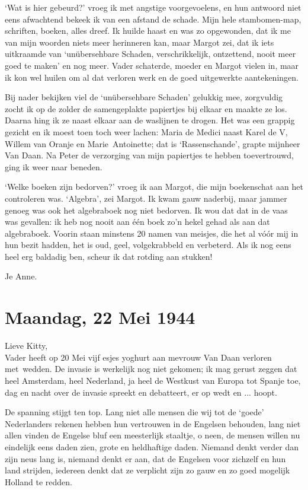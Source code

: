 \documentclass{book}
\begin{document}
`Wat is hier gebeurd?' vroeg ik met angstige voorgevoelens, en hun antwoord niet
eens afwachtend bekeek ik van een afstand de schade. Mijn hele stambomen-map,
schriften, boeken, alles dreef. Ik huilde haast en was zo opgewonden, dat ik me
van mijn woorden niets meer herinneren kan, maar Margot zei, dat ik iets
uitkraamde van `unübersehbare Schaden, verschrikkelijk, ontzettend, nooit meer
goed te maken' en nog meer.  Vader schaterde, moeder en Margot vielen in, maar
ik kon wel huilen om al dat verloren werk en de goed uitgewerkte aantekeningen.

Bij nader bekijken viel de `unübersehbare Schaden' gelukkig mee, zorgvuldig
zocht ik op de zolder de samengeplakte papiertjes bij elkaar en maakte ze los.
Daarna hing ik ze naast elkaar aan de waslijnen te drogen. Het was een grappig
gezicht en ik moest toen toch weer lachen: Maria de Medici naast Karel de V,
Willem van Oranje en Marie~Antoinette; dat is `Rassenschande', grapte mijnheer
Van Daan. Na Peter de verzorging van mijn papiertjes te hebben toevertrouwd,
ging ik weer naar beneden.

`Welke boeken zijn bedorven?' vroeg ik aan Margot, die mijn boekenschat aan het
controleren was. `Algebra', zei Margot. Ik kwam gauw naderbij, maar jammer
genoeg was ook het algebraboek nog niet bedorven. Ik wou dat dat in de vaas was
gevallen: ik heb nog nooit aan één boek zo'n hekel gehad als aan dat
algebraboek. Voorin staan minstens 20 namen van meisjes, die het al vóór mij in
hun bezit hadden, het is oud, geel, volgekrabbeld en verbeterd. Als ik nog eens
heel erg baldadig ben, scheur ik dat rotding aan stukken!

Je Anne.

\section*{Maandag, 22 Mei 1944}

Lieve Kitty,\\
Vader heeft op 20 Mei vijf esjes yoghurt aan mevrouw Van Daan
verloren met~wedden. De invasie is werkelijk nog niet gekomen; ik mag gerust
zeggen dat heel Amsterdam, heel Nederland, ja heel de Westkust van Europa tot
Spanje toe, dag en nacht over de invasie spreekt en debatteert, er op wedt en
... hoopt.

De spanning stijgt ten top. Lang niet alle mensen die wij tot de `goede'
Nederlanders rekenen hebben hun vertrouwen in de Engelsen behouden, lang niet
allen vinden de Engelse bluf een meesterlijk staaltje, o neen, de mensen willen
nu eindelijk eens daden zien, grote en heldhaftige daden.  Niemand denkt verder
dan zijn neus lang is, niemand denkt er aan, dat de Engelsen voor zichzelf en
hun land strijden, iedereen denkt dat ze verplicht zijn zo gauw en zo goed
mogelijk Holland te redden.
\end{document}

